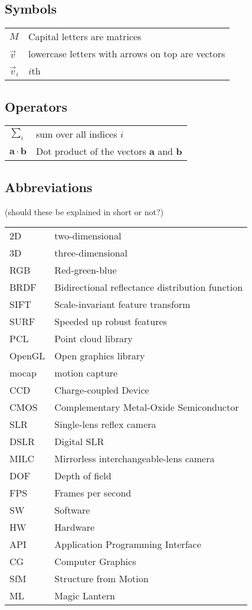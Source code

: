 
\subsection*{Symbols}

\begin{tabular}{ll}
$M$	& Capital letters are matrices\\
$\vec v$	& lowercase letters with arrows on top are vectors\\
$\vec v_i$	& $i$th 
\end{tabular}


\subsection*{Operators}

\begin{tabular}{ll}
$\sum_i $                        & sum over all indices $i$\\
$\mathbf{a} \cdot \mathbf{b}$    & Dot product of the vectors $\mathbf{a}$ and $\mathbf{b}$
\end{tabular}

\subsection*{Abbreviations}

(should these be explained in short or not?)

\begin{tabular}{ll}
	2D & two-dimensional\\
	3D & three-dimensional\\
	RGB & Red-green-blue\\
	BRDF & Bidirectional reflectance distribution function\\
	SIFT & Scale-invariant feature transform\\
	SURF & Speeded up robust features \\
	PCL & Point cloud library\\
	OpenGL & Open graphics library\\
	mocap & motion capture\\
	CCD & Charge-coupled Device\\
	CMOS & Complementary Metal-Oxide Semiconductor\\
	SLR & Single-lens reflex camera\\
	DSLR & Digital SLR\\
	MILC & Mirrorless interchangeable-lens camera\\
	DOF & Depth of field\\
	FPS & Frames per second\\
	SW & Software\\
	HW & Hardware\\
	API & Application Programming Interface\\
	CG & Computer Graphics\\
	SfM & Structure from Motion\\
	ML & Magic Lantern\\
\end{tabular}

